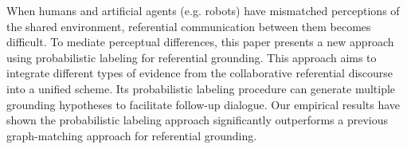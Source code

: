 When humans and artificial agents (e.g. robots) have mismatched perceptions of the shared environment, referential communication between them becomes difficult. To mediate perceptual differences, this paper presents a new approach using probabilistic labeling for referential grounding. This approach aims to integrate different types of evidence from the collaborative referential discourse into a unified scheme. Its probabilistic labeling procedure can generate multiple grounding hypotheses to facilitate follow-up dialogue. Our empirical results have shown the probabilistic labeling approach significantly outperforms a previous graph-matching approach for referential grounding.
